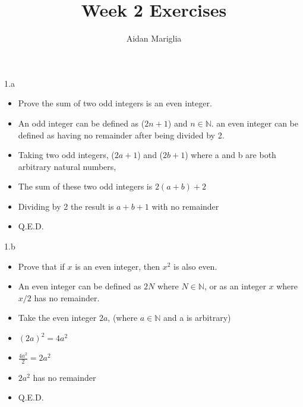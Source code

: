 \documentclass[12pt]{article}
\title{Week 2 Exercises}
\author{Aidan Mariglia}
\begin{document}
\maketitle

{\large 1.a \par}

\begin{itemize}

\item Prove the sum of two odd integers is an even integer. 
\item An odd integer can be defined as ($2n + 1$) and
$n \in \mathbb{N}$.
an even integer can be defined as having no remainder after being divided by 2. 


\item Taking two odd integers, ($2a + 1$) and ($2b + 1$) where a and b are 
both arbitrary natural numbers,

\item The sum of these two odd integers is $2(a + b) + 2$

\item Dividing by 2 the result is $a + b + 1$ with no remainder
\item Q.E.D.

\end{itemize}

{\large 1.b \par}

\begin{itemize}

\item Prove that if $x$ is an even integer, then $x^2$ is also even.

\item An even integer can be defined as $2N$ where $N \in \mathbb{N}$,
or as an integer $x$ where $x/2$ has no remainder.

\item Take the even integer $2a$, (where $a \in \mathbb{N}$ and a is arbitrary)

\item $(2a)^2 = 4a^2$ 

\item $\frac{4a^2}{2} = 2a^2$

\item $2a^2$ has no remainder
\item Q.E.D.


\end{itemize}

\newpage
\end{document}
